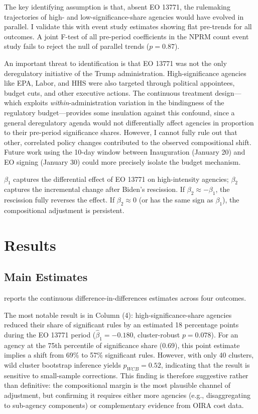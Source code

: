 \documentclass[12pt]{article}
\begin{document}
The key identifying assumption is that, absent EO 13771, the rulemaking trajectories of high- and low-significance-share agencies would have evolved in parallel. I validate this with event study estimates showing flat pre-trends for all outcomes. A joint F-test of all pre-period coefficients in the NPRM count event study fails to reject the null of parallel trends ($p = 0.87$).

An important threat to identification is that EO 13771 was not the only deregulatory initiative of the Trump administration. High-significance agencies like EPA, Labor, and HHS were also targeted through political appointees, budget cuts, and other executive actions. The continuous treatment design---which exploits \textit{within}-administration variation in the bindingness of the regulatory budget---provides some insulation against this confound, since a general deregulatory agenda would not differentially affect agencies in proportion to their pre-period significance shares. However, I cannot fully rule out that other, correlated policy changes contributed to the observed compositional shift. Future work using the 10-day window between Inauguration (January 20) and EO signing (January 30) could more precisely isolate the budget mechanism.

$\beta_1$ captures the differential effect of EO 13771 on high-intensity agencies; $\beta_2$ captures the incremental change after Biden's rescission. If $\beta_2 \approx -\beta_1$, the rescission fully reverses the effect. If $\beta_2 \approx 0$ (or has the same sign as $\beta_1$), the compositional adjustment is persistent.


\section{Results}

\subsection{Main Estimates}

 reports the continuous difference-in-differences estimates across four outcomes.



The most notable result is in Column (4): high-significance-share agencies reduced their share of significant rules by an estimated 18 percentage points during the EO 13771 period ($\hat{\beta}_1 = -0.180$, cluster-robust $p = 0.078$). For an agency at the 75th percentile of significance share (0.69), this point estimate implies a shift from 69\% to 57\% significant rules. However, with only 40 clusters, wild cluster bootstrap inference yields $p_{WCB} = 0.52$, indicating that the result is sensitive to small-sample corrections. This finding is therefore suggestive rather than definitive: the compositional margin is the most plausible channel of adjustment, but confirming it requires either more agencies (e.g., disaggregating to sub-agency components) or complementary evidence from OIRA cost data.
\end{document}
